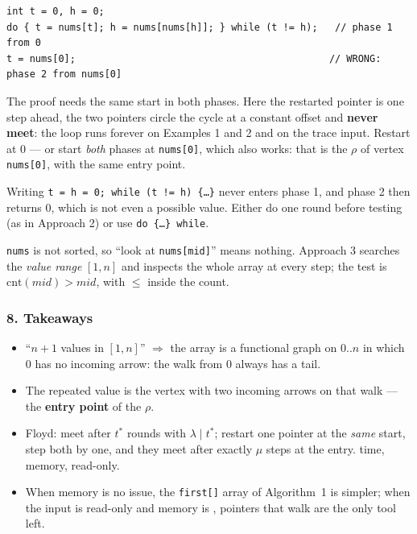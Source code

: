 \begin{warningbox}
\begin{lstlisting}[style=snippet]
int t = 0, h = 0;
do { t = nums[t]; h = nums[nums[h]]; } while (t != h);   // phase 1 from 0
t = nums[0];                                            // WRONG: phase 2 from nums[0]
\end{lstlisting}
The proof needs the same start in both phases. Here the restarted pointer is one step ahead, the two pointers circle the cycle at a constant offset and \textbf{never meet}: the loop runs forever on Examples 1 and 2 and on the trace input. Restart at $0$ --- or start \emph{both} phases at \texttt{nums[0]}, which also works: that is the $\rho$ of vertex \texttt{nums[0]}, with the same entry point.
\end{warningbox}

\begin{warningbox}
Writing \texttt{t = h = 0; while (t != h) \{\ldots\}} never enters phase 1, and phase 2 then returns $0$, which is not even a possible value. Either do one round before testing (as in Approach 2) or use \texttt{do \{\ldots\} while}.
\end{warningbox}

\begin{warningbox}
\texttt{nums} is not sorted, so ``look at \texttt{nums[mid]}'' means nothing. Approach 3 searches the \emph{value range} $[1, n]$ and inspects the whole array at every step; the test is $\text{cnt}(\textit{mid}) > \textit{mid}$, with $\le$ inside the count.
\end{warningbox}

\subsubsection*{8. Takeaways}

\begin{itemize}[leftmargin=*]
    \item ``$n+1$ values in $[1, n]$'' $\Rightarrow$ the array is a functional graph on $0..n$ in which $0$ has no incoming arrow: the walk from $0$ always has a tail.
    \item The repeated value is the vertex with two incoming arrows on that walk --- the \textbf{entry point} of the $\rho$.
    \item Floyd: meet after $t^\ast$ rounds with $\lambda \mid t^\ast$; restart one pointer at the \emph{same} start, step both by one, and they meet after exactly $\mu$ steps at the entry.  time,  memory, read-only.
    \item When memory is no issue, the \texttt{first[]} array of Algorithm~1 is simpler; when the input is read-only and memory is , pointers that walk are the only tool left.
\end{itemize}

